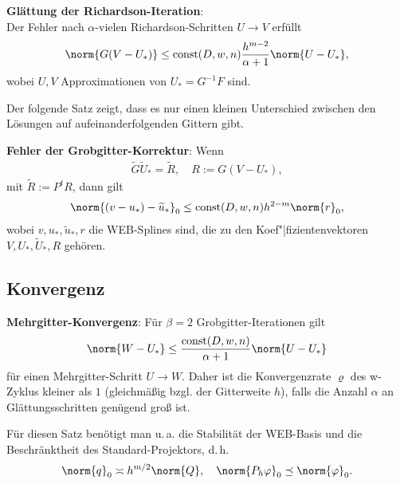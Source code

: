 \textbf{Glättung der Richardson-Iteration}:\\
Der Fehler nach $\alpha$-vielen Richardson-Schritten $U \rightarrow V$ erfüllt
\begin{align*}
    \norm{G (V - U_\ast)} \le \const(D, w, n) \frac{h^{m-2}}{\alpha+1} \norm{U - U_\ast},
\end{align*}
wobei $U, V$ Approximationen von $U_\ast = G^{-1} F$ sind.

\linie
\pagebreak

Der folgende Satz zeigt, dass es nur einen kleinen Unterschied zwischen den Lösungen
auf aufeinanderfolgenden Gittern gibt.

\textbf{Fehler der Grobgitter-Korrektur}:
Wenn
\begin{align*}
    \widetilde{G} \widetilde{U}_\ast = \widetilde{R},\quad
    R := G(V - U_\ast),
\end{align*}
mit $\widetilde{R} := P^t R$,
dann gilt
\begin{align*}
    \norm{(v - u_\ast) - \widetilde{u}_\ast}_0 \le \const(D, w, n) h^{2-m} \norm{r}_0,
\end{align*}
wobei $v, u_\ast, \widetilde{u}_\ast, r$ die WEB-Splines sind, die zu den Koef"|fizientenvektoren
$V, U_\ast, \widetilde{U}_\ast, R$ gehören.

\subsection{%
    Konvergenz%
}

\textbf{Mehrgitter-Konvergenz}:
Für $\beta = 2$ Grobgitter-Iterationen gilt
\begin{align*}
    \norm{W - U_\ast} \le \frac{\const(D, w, n)}{\alpha + 1} \norm{U - U_\ast}
\end{align*}
für einen Mehrgitter-Schritt $U \rightarrow W$.
Daher ist die Konvergenzrate $\varrho$ des w-Zyklus kleiner als $1$
(gleichmäßig bzgl. der Gitterweite $h$), falls die Anzahl $\alpha$ an Glättungsschritten
genügend groß ist.

Für diesen Satz benötigt man u.\,a. die Stabilität der WEB-Basis
und die Beschränktheit des Standard-Projektors, d.\,h.
\begin{align*}
    \norm{q}_0 \asymp h^{m/2} \norm{Q},\quad
    \norm{P_h \varphi}_0 \preceq \norm{\varphi}_0.
\end{align*}

\pagebreak
